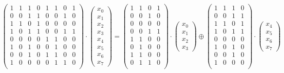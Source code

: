\[
    \begin{pmatrix}
        1 & 1 & 1 & 0 & 1 & 1 & 0 & 1 \\
        0 & 0 & 1 & 1 & 0 & 0 & 1 & 0 \\
        1 & 1 & 0 & 1 & 0 & 0 & 0 & 0 \\
        1 & 0 & 1 & 1 & 0 & 0 & 1 & 1 \\
        0 & 0 & 0 & 0 & 1 & 1 & 0 & 0 \\
        1 & 0 & 1 & 0 & 0 & 1 & 0 & 0 \\
        0 & 0 & 1 & 0 & 1 & 1 & 0 & 0 \\
        1 & 0 & 0 & 0 & 0 & 1 & 1 & 0 \\
    \end{pmatrix}\cdot
    \begin{pmatrix}x_0\\x_1\\x_2\\x_3\\x_4\\x_5\\x_6\\x_7\end{pmatrix}=
    \begin{pmatrix}
        1 & 1 & 0 & 1 \\
        0 & 0 & 1 & 0 \\
        0 & 0 & 0 & 0 \\
        0 & 0 & 1 & 1 \\
        1 & 1 & 0 & 0 \\
        0 & 1 & 0 & 0 \\
        1 & 1 & 0 & 0 \\
        0 & 1 & 1 & 0 \\
    \end{pmatrix}\cdot
    \begin{pmatrix}x_0\\x_1\\x_2\\x_3\end{pmatrix}\oplus
    \begin{pmatrix}
        1 & 1 & 1 & 0 \\
        0 & 0 & 1 & 1 \\
        1 & 1 & 0 & 1 \\
        1 & 0 & 1 & 1 \\
        0 & 0 & 0 & 0 \\
        1 & 0 & 1 & 0 \\
        0 & 0 & 1 & 0 \\
        1 & 0 & 0 & 0 \\
    \end{pmatrix}\cdot
    \begin{pmatrix}x_4\\x_5\\x_6\\x_7\end{pmatrix}
\]

